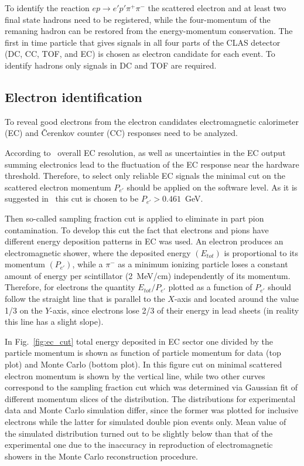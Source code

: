 \documentclass[prc,twocolumn,superscriptaddress,showpacs,amssymb,amsmath,amsfonts,linenumbers,aps]{revtex4-1}
\begin{document}
To identify the reaction $e p \rightarrow e' p' \pi^{+} \pi^{-}$ the scattered electron and at least two final state hadrons need to be registered, while the four-momentum of the remaning hadron can be restored from the energy-momentum conservation.
The first in time particle that gives signals in all four parts of the CLAS detector (DC, CC, TOF, and EC) is chosen as electron candidate for each event. To identify hadrons only signals in DC and TOF are required.


\subsection{Electron identification}

To reveal good electrons from the electron candidates  electromagnetic calorimeter (EC) and \v Cerenkov counter (CC) responses need to be analyzed.

According to~\cite{Egian:007} overall EC resolution, as well as uncertainties in the EC output summing electronics lead to the fluctuation of the EC response near the hardware threshold. Therefore, to select only reliable EC signals the minimal cut on the scattered electron momentum $P_{e'}$ should be applied on the software level. As it is suggested in~\cite{Egian:007} this cut is chosen to be $P_{e'} > 0.461$~GeV.


Then so-called sampling fraction cut is applied to  eliminate in part pion contamination. To develop this cut the fact that electrons and pions
have different  energy deposition patterns in EC was used. An electron produces an electromagnetic shower, where the
deposited energy $(E_{tot})$ is proportional to its momentum $(P_{e'})$, while a $\pi^{-}$ as  a minimum ionizing particle loses a constant
amount of energy per scintillator (2~MeV/cm) independently of its momentum. 
Therefore, for electrons the quantity $E_{tot}/P_{e'}$ plotted as a function of $P_{e'}$ should follow the straight line that is parallel to the $X$-axis and located around the value 1/3 on the $Y$-axis, since electrons lose 2/3 of their energy in lead sheets (in reality this line has a slight slope).


In Fig.~\ref{fig:ec_cut} total energy deposited in EC sector one divided by the particle momentum is shown as function of particle momentum for data (top plot) and Monte Carlo (bottom plot). In this figure cut on minimal scattered electron momentum is shown by the vertical line, while two other curves correspond to the sampling fraction cut which was determined via Gaussian fit of different momentum slices of the distribution. The distributions for experimental data and Monte Carlo simulation differ, since the former was plotted for inclusive electrons while the latter for simulated double pion events only.
Mean value of the simulated distribution turned out to be slightly below than that of the experimental one 
due to the inaccuracy in reproduction of electromagnetic showers in the Monte Carlo reconstruction procedure.
\end{document}
